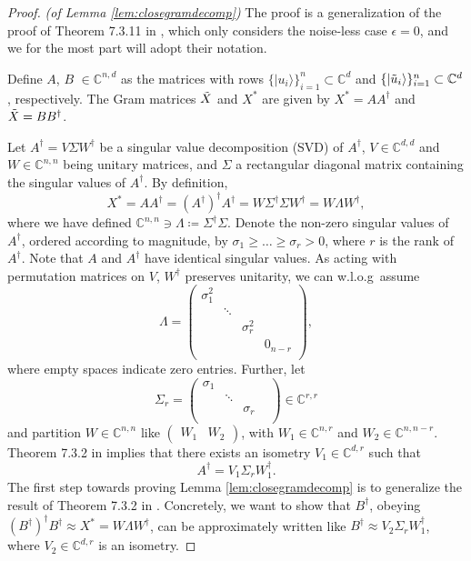 \begin{proof}\emph{(of Lemma \ref{lem:closegramdecomp})}\hfill\break
The proof is a generalization of the proof of Theorem 7.3.11 in \cite{Horn2013}, which only considers the noise-less case $\epsilon=0$, and we for the most part will adopt their notation. 

Define $A$, $B$ $\in\mathbb{C}^{n,d}$ as the matrices with rows $\{\vert u_i\rangle\}_{i=1}^n\subset\mathbb{C}^{d}$ and $\{\vert \Tilde{u}_i \rangle\}_{i=1}^n\subset\mathbb{C}^{d}$, respectively. The Gram matrices $\Tilde{X}$ and $X^*$ are given by $X^*=AA^{\dag}$ and $\Tilde{X}=BB^{\dag}$. 

Let $A^\dag = V\Sigma W^\dag$ be a singular value decomposition (SVD) of $A^\dag$, $V\in\mathbb{C}^{d,d}$ and $W\in\mathbb{C}^{n,n}$ being unitary matrices, and $\Sigma$ a rectangular diagonal matrix containing the singular values of $A^\dag$. By definition, 
\begin{equation*}
X^*=AA^\dag=(A^\dag)^{\dag} A^{\dag} = W\Sigma^\dag\Sigma W^\dag = W\Lambda W^\dag,
\end{equation*} where we have defined $\mathbb{C}^{n,n}\ni\Lambda\coloneqq\Sigma^\dag\Sigma$. Denote the non-zero singular values of $A^\dag$, ordered according to magnitude, by $\sigma_1 \geq \dots \geq \sigma_r > 0$, where $r$ is the rank of $A^\dag$. Note that $A$ and $A^{\dag}$ have identical singular values. As acting with permutation matrices on $V$, $W^{\dag}$ preserves unitarity, we can w.l.o.g\ assume
\begin{equation*}
\Lambda = 
\begin{pmatrix}
\sigma_1^2 & & & \\
& \ddots & & \\
& & \sigma_r^2 & \\
& & & 0_{n-r}\\
\end{pmatrix},
\end{equation*}
where empty spaces indicate zero entries.
Further, let
\begin{equation*}
\Sigma_r = 
\begin{pmatrix}
\sigma_1 & &\\
& \ddots & & \\
& & \sigma_r\\
\end{pmatrix}\in\mathbb{C}^{r,r}
\end{equation*} and partition $W\in\mathbb{C}^{n,n}$ like 
$\begin{pmatrix}
W_1 & W_2
\end{pmatrix}$, with $W_1\in\mathbb{C}^{n,r}$ and $W_2\in\mathbb{C}^{n,n-r}$. Theorem 7.3.2 in \cite{Horn2013} implies that there exists an isometry $V_1\in\mathbb{C}^{d,r}$ such that 
\begin{equation*}
A^{\dag}=V_1\Sigma_r W_1^{\dag}.
\end{equation*}
The first step towards proving Lemma \ref{lem:closegramdecomp} is to generalize the result of Theorem 7.3.2 in \cite{Horn2013}. Concretely, we want to show that $B^{\dag}$, obeying $(B^{\dag})^{\dag}B^{\dag}\approx X^* = W\Lambda W^{\dag}$, can be approximately written like $B^{\dag}\approx V_2\Sigma_rW_1^{\dag}$, where $V_2\in\mathbb{C}^{d,r}$ is an isometry.


\end{proof}

